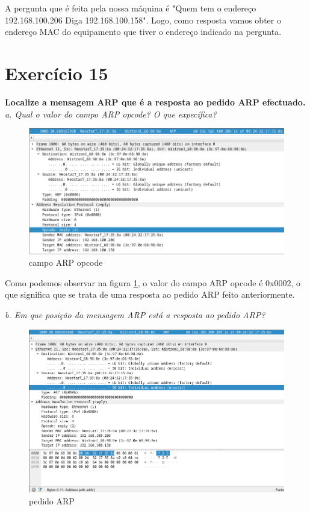 \documentclass[a4paper]{report}
\begin{document}
A pergunta que é feita pela nossa máquina é "Quem tem o endereço 192.168.100.206
Diga 192.168.100.158". Logo, como resposta vamos obter o endereço MAC do equipamento
que tiver o endereço indicado na pergunta.

\section{Exercício 15}
\textbf{Localize a mensagem ARP que é a resposta ao pedido ARP efectuado.}
\textit{a. Qual o valor do campo ARP opcode? O que expecífica?}
\begin{figure}[H]
    \centering 
    \includegraphics[width=\textwidth]{images/ex15a.png}
    \caption{campo ARP opcode}
    \label{fig:ex15a}
\end{figure}

Como podemos observar na figura \ref{fig:ex15a}, o valor do campo ARP opcode é 0x0002,
o que significa que se trata de uma resposta ao pedido ARP feito anteriormente.

\textit{b. Em que posição da mensagem ARP está a resposta ao pedido ARP?}


\begin{figure}[H]
    \centering 
    \includegraphics[width=\textwidth]{images/ex15b.png}
    \caption{pedido ARP}
    \label{fig:ex15b}
\end{figure}
\end{document}
